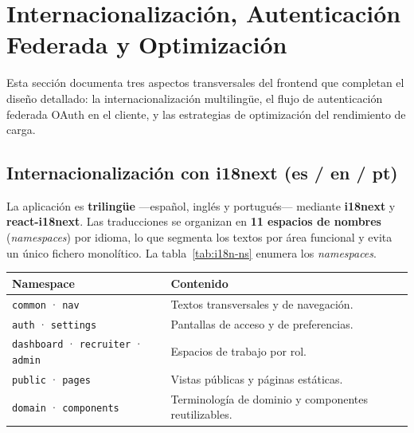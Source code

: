 \section{Internacionalización, Autenticación Federada y Optimización}
\label{sec:i18n_build}

Esta sección documenta tres aspectos transversales del frontend que completan el diseño
detallado: la internacionalización multilingüe, el flujo de autenticación federada OAuth
en el cliente, y las estrategias de optimización del rendimiento de carga.

\subsection{Internacionalización con i18next (es / en / pt)}
\label{subsec:i18n}

La aplicación es \textbf{trilingüe} —español, inglés y portugués— mediante
\textbf{i18next} y \textbf{react-i18next}. Las traducciones se organizan en \textbf{11
espacios de nombres} (\textit{namespaces}) por idioma, lo que segmenta los textos por
área funcional y evita un único fichero monolítico. La tabla~\ref{tab:i18n-ns} enumera los
\textit{namespaces}.

\clearpage
\vspace{0.2cm}
\noindent
\renewcommand{\arraystretch}{1.3}
\fontsize{8.5}{10.2}\selectfont\sffamily
\begin{tabularx}{\textwidth}{|L{3.0cm}|Y|}
\hline
{}
\sffamily\textbf{Namespace} & \sffamily\textbf{Contenido} \\
\hline
\texttt{common} · \texttt{nav} & Textos transversales y de navegación. \\ \hline
{}
\texttt{auth} · \texttt{settings} & Pantallas de acceso y de preferencias. \\ \hline
\texttt{dashboard} · \texttt{recruiter} · \texttt{admin} & Espacios de trabajo por rol. \\ \hline
{}
\texttt{public} · \texttt{pages} & Vistas públicas y páginas estáticas. \\ \hline
\texttt{domain} · \texttt{components} & Terminología de dominio y componentes reutilizables. \\ \hline
\end{tabularx}
\label{tab:i18n-ns}

